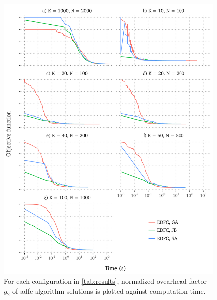 \documentclass[12pt,journal,draftclsnofoot,onecolumn]{IEEEtran}
\begin{document}
\begin{figure}[htp]
	\includegraphics[]{figures/progress-edfc.png}
	\caption{For each configuration in \autoref{tab:results}, normalized ovearhead factor $g_2$ of \gls{adfc} algorithm solutions is plotted against computation time.}
	\label{fig:progress-edfc}
\end{figure}
\end{document}
